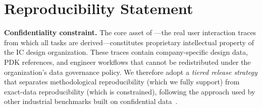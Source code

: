 \section*{Reproducibility Statement}
\label{sec:reproducibility}


\textbf{Confidentiality constraint.} The core asset of \bench---the real user interaction traces from which all \Ntasks{} tasks are derived---constitutes proprietary intellectual property of the IC design organization. These traces contain company-specific design data, PDK references, and engineer workflows that cannot be redistributed under the organization's data governance policy. We therefore adopt a \emph{tiered release strategy} that separates methodological reproducibility (which we fully support) from exact-data reproducibility (which is constrained), following the approach used by other industrial benchmarks built on confidential data~\cite{rao2026sap, sulthanpete2026nyris}.

